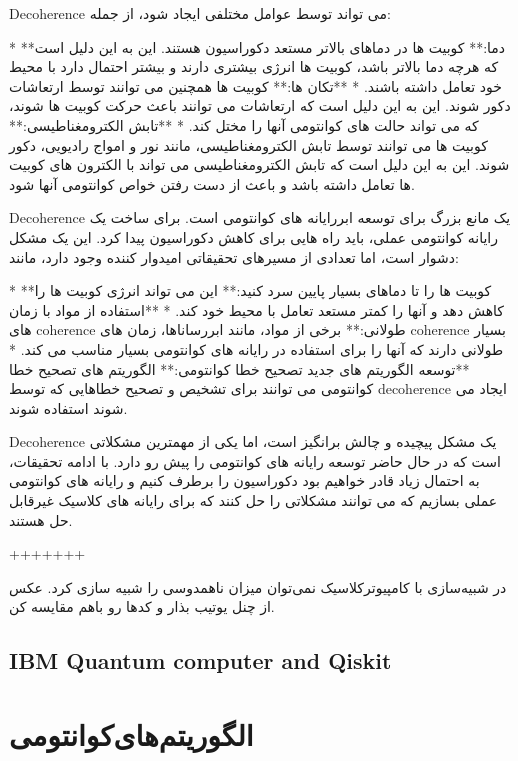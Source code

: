 \documentclass{book}
\begin{document}
Decoherence می تواند توسط عوامل مختلفی ایجاد شود، از جمله:

* **دما:** کوبیت ها در دماهای بالاتر مستعد دکوراسیون هستند. این به این دلیل است که هرچه دما بالاتر باشد، کوبیت ها انرژی بیشتری دارند و بیشتر احتمال دارد با محیط خود تعامل داشته باشند.
* **تکان ها:** کوبیت ها همچنین می توانند توسط ارتعاشات دکور شوند. این به این دلیل است که ارتعاشات می توانند باعث حرکت کوبیت ها شوند، که می تواند حالت های کوانتومی آنها را مختل کند.
* **تابش الکترومغناطیسی:** کوبیت ها می توانند توسط تابش الکترومغناطیسی، مانند نور و امواج رادیویی، دکور شوند. این به این دلیل است که تابش الکترومغناطیسی می تواند با الکترون های کوبیت ها تعامل داشته باشد و باعث از دست رفتن خواص کوانتومی آنها شود.

Decoherence یک مانع بزرگ برای توسعه ابررایانه های کوانتومی است. برای ساخت یک رایانه کوانتومی عملی، باید راه هایی برای کاهش دکوراسیون پیدا کرد. این یک مشکل دشوار است، اما تعدادی از مسیرهای تحقیقاتی امیدوار کننده وجود دارد، مانند:

* **کوبیت ها را تا دماهای بسیار پایین سرد کنید:** این می تواند انرژی کوبیت ها را کاهش دهد و آنها را کمتر مستعد تعامل با محیط خود کند.
* **استفاده از مواد با زمان های coherence طولانی:** برخی از مواد، مانند ابررساناها، زمان های coherence بسیار طولانی دارند که آنها را برای استفاده در رایانه های کوانتومی بسیار مناسب می کند.
* **توسعه الگوریتم های جدید تصحیح خطا کوانتومی:** الگوریتم های تصحیح خطا کوانتومی می توانند برای تشخیص و تصحیح خطاهایی که توسط decoherence ایجاد می شوند استفاده شوند.

Decoherence یک مشکل پیچیده و چالش برانگیز است، اما یکی از مهمترین مشکلاتی است که در حال حاضر توسعه رایانه های کوانتومی را پیش رو دارد. با ادامه تحقیقات، به احتمال زیاد قادر خواهیم بود دکوراسیون را برطرف کنیم و رایانه های کوانتومی عملی بسازیم که می توانند مشکلاتی را حل کنند که برای رایانه های کلاسیک غیرقابل حل هستند.

+++++++

در شبیه‌سازی با کامپیوترکلاسیک نمی‌توان میزان ناهمدوسی را شبیه سازی کرد. 
عکس از چنل یوتیب بذار و کدها رو باهم مقایسه کن.

\newpage


\section{IBM Quantum computer and Qiskit}




\newpage



\chapter{الگوریتم‌های‌کوانتومی‌}
\end{document}
